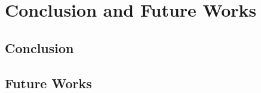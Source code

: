 \documentclass[document.tex]{subfiles}
\begin{document}
\chapter{Conclusion and Future Works}

\section{Conclusion}
\section{Future Works}
\end{document}
